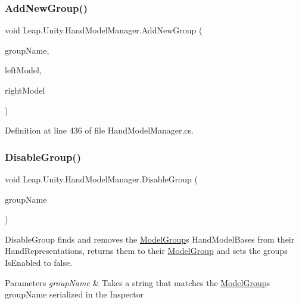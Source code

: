 \subsubsection{\texorpdfstring{AddNewGroup()}{AddNewGroup()}}
{\footnotesize\ttfamily void Leap.\+Unity.\+Hand\+Model\+Manager.\+Add\+New\+Group (\begin{DoxyParamCaption}\item[{string}]{group\+Name,  }\item[{\mbox{\hyperlink{class_leap_1_1_unity_1_1_hand_model_base}{Hand\+Model\+Base}}}]{left\+Model,  }\item[{\mbox{\hyperlink{class_leap_1_1_unity_1_1_hand_model_base}{Hand\+Model\+Base}}}]{right\+Model }\end{DoxyParamCaption})}



Definition at line 436 of file Hand\+Model\+Manager.\+cs.

\mbox{\label{class_leap_1_1_unity_1_1_hand_model_manager_a177e891c24a7008b823c0d2d48696171}} 
\subsubsection{\texorpdfstring{DisableGroup()}{DisableGroup()}}
{\footnotesize\ttfamily void Leap.\+Unity.\+Hand\+Model\+Manager.\+Disable\+Group (\begin{DoxyParamCaption}\item[{string}]{group\+Name }\end{DoxyParamCaption})}

Disable\+Group finds and removes the \mbox{\hyperlink{class_leap_1_1_unity_1_1_hand_model_manager_1_1_model_group}{Model\+Group}}\textquotesingle{}s Hand\+Model\+Bases from their Hand\+Representations, returns them to their \mbox{\hyperlink{class_leap_1_1_unity_1_1_hand_model_manager_1_1_model_group}{Model\+Group}} and sets the groups Is\+Enabled to false. 
\begin{DoxyParams}{Parameters}
{\em group\+Name} & Takes a string that matches the \mbox{\hyperlink{class_leap_1_1_unity_1_1_hand_model_manager_1_1_model_group}{Model\+Group}}\textquotesingle{}s group\+Name serialized in the Inspector \\
\hline
\end{DoxyParams}


